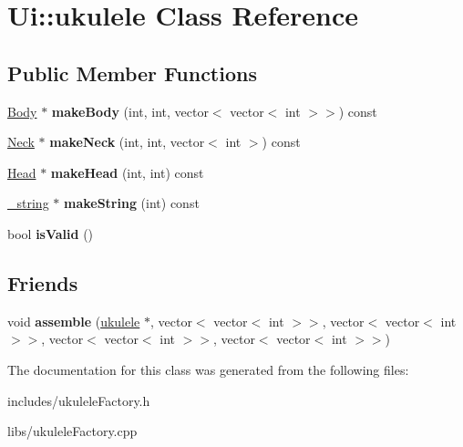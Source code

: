 \hypertarget{class_ui_1_1ukulele}{}\section{Ui\+:\+:ukulele Class Reference}
\label{class_ui_1_1ukulele}
\subsection*{Public Member Functions}
\begin{DoxyCompactItemize}
\item 
\hypertarget{class_ui_1_1ukulele_a6b86e918773f8be9ec37e9d28ecf1410}{}\label{class_ui_1_1ukulele_a6b86e918773f8be9ec37e9d28ecf1410} 
\hyperlink{class_ui_1_1_body}{Body} $\ast$ {\bfseries make\+Body} (int, int, vector$<$ vector$<$ int $>$$>$) const
\item 
\hypertarget{class_ui_1_1ukulele_a72f277f8dfd9c4af6140681b1755223d}{}\label{class_ui_1_1ukulele_a72f277f8dfd9c4af6140681b1755223d} 
\hyperlink{class_ui_1_1_neck}{Neck} $\ast$ {\bfseries make\+Neck} (int, int, vector$<$ int $>$) const
\item 
\hypertarget{class_ui_1_1ukulele_a0bffda66d65c9f382826b20731e5794c}{}\label{class_ui_1_1ukulele_a0bffda66d65c9f382826b20731e5794c} 
\hyperlink{class_ui_1_1_head}{Head} $\ast$ {\bfseries make\+Head} (int, int) const
\item 
\hypertarget{class_ui_1_1ukulele_adc1375800c8ca14551f68de9cd8f10dd}{}\label{class_ui_1_1ukulele_adc1375800c8ca14551f68de9cd8f10dd} 
\hyperlink{class_ui_1_1__string}{\+\_\+string} $\ast$ {\bfseries make\+String} (int) const
\item 
\hypertarget{class_ui_1_1ukulele_abaebb7db2f23ebebb1775200cca5dac6}{}\label{class_ui_1_1ukulele_abaebb7db2f23ebebb1775200cca5dac6} 
bool {\bfseries is\+Valid} ()
\end{DoxyCompactItemize}
\subsection*{Friends}
\begin{DoxyCompactItemize}
\item 
\hypertarget{class_ui_1_1ukulele_a9361e21a6238ec9f3e3d50fc8b3880cc}{}\label{class_ui_1_1ukulele_a9361e21a6238ec9f3e3d50fc8b3880cc} 
void {\bfseries assemble} (\hyperlink{class_ui_1_1ukulele}{ukulele} $\ast$, vector$<$ vector$<$ int $>$$>$, vector$<$ vector$<$ int $>$$>$, vector$<$ vector$<$ int $>$$>$, vector$<$ vector$<$ int $>$$>$)
\end{DoxyCompactItemize}


The documentation for this class was generated from the following files\+:\begin{DoxyCompactItemize}
\item 
includes/ukulele\+Factory.\+h\item 
libs/ukulele\+Factory.\+cpp\end{DoxyCompactItemize}
